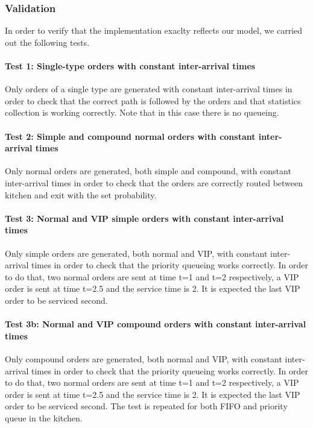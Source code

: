 \subsubsection{Validation}
In order to verify that the implementation exaclty reflects our model, we 
carried out the following tests.

\paragraph{Test 1: Single-type orders with constant inter-arrival times}
Only orders of a single type are generated with constant inter-arrival times
in order to check that the correct path is followed by the orders and that 
statistics collection is working correctly. 
Note that in this case there is no queueing.

\paragraph{Test 2: Simple and compound normal orders with constant inter-arrival times}
Only normal orders are generated, both simple and compound, with constant inter-arrival times
in order to check that the orders are correctly routed between kitchen and exit with 
the set probability.

\paragraph{Test 3: Normal and VIP simple orders with constant inter-arrival times}
Only simple orders are generated, both normal and VIP, with constant inter-arrival times
in order to check that the priority queueing works correctly. In order to do that, 
two normal orders are sent at time t=1 and t=2 respectively, a VIP order is sent 
at time t=2.5 and the service time is 2. It is expected the last VIP order to be 
serviced second.

\paragraph{Test 3b: Normal and VIP compound orders with constant inter-arrival times}
Only compound orders are generated, both normal and VIP, with constant inter-arrival times
in order to check that the priority queueing works correctly. In order to do that, 
two normal orders are sent at time t=1 and t=2 respectively, a VIP order is sent 
at time t=2.5 and the service time is 2. It is expected the last VIP order to be 
serviced second. The test is repeated for both FIFO and priority queue in the kitchen.

